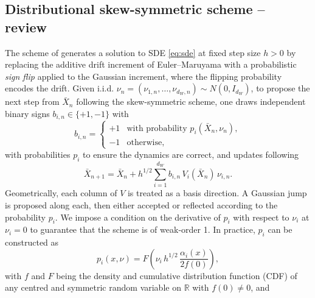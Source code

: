 \documentclass[11pt]{article}
\begin{document}
\subsection{Distributional skew-symmetric scheme -- review}\label{sec:review.ss}

The scheme of \cite{skew:ima} generates a solution to SDE \eqref{eq:sde} at fixed step size $h>0$ by replacing the additive drift increment of Euler--Maruyama with a probabilistic \emph{sign flip} applied to the Gaussian increment, where the flipping probability encodes the drift.
Given i.i.d. $\nu_n = (\nu_{1,n}, \dots, \nu_{d_W,n}) \sim N(0, I_{d_W})$, to propose the next step from $\bar{X}_n$ following the skew-symmetric scheme, one draws independent binary signs $b_{i,n} \in \{+1, -1\}$ with
\begin{equation}
  b_{i,n} =
  \begin{cases}
    +1 & \text{with probability } p_i(\bar{X}_n, \nu_n), \\
    -1 & \text{otherwise},
  \end{cases}
\end{equation}
with probabilities $p_i$ to ensure the dynamics are correct, and updates following
\begin{equation}
    \bar{X}_{n+1}
  = \bar{X}_n + h^{1/2}\sum_{i=1}^{d_W} b_{i,n}\, V_i(\bar{X}_n)\, \nu_{i,n}.
  \label{eq:ss-update}
\end{equation}
Geometrically, each column of $V$ is treated as a basis direction. A Gaussian jump is proposed along each, then either accepted or reflected according to the probability $p_i$. We impose a condition on the derivative of $p_i$ with respect to $\nu_i$ at $\nu_i=0$ to guarantee that the scheme is of weak-order 1. In practice, $p_i$ can be constructed as 
\begin{equation*}
  p_i(x, \nu) = F\left( \nu_i\, h^{1/2}\, \frac{\alpha_i(x)}{2 f(0)} \right),
\end{equation*}
with $f$ and $F$ being the density and cumulative distribution function (CDF) of any centred and symmetric random variable on $\mathbb{R}$ with $f(0) \neq 0$, and
\end{document}

